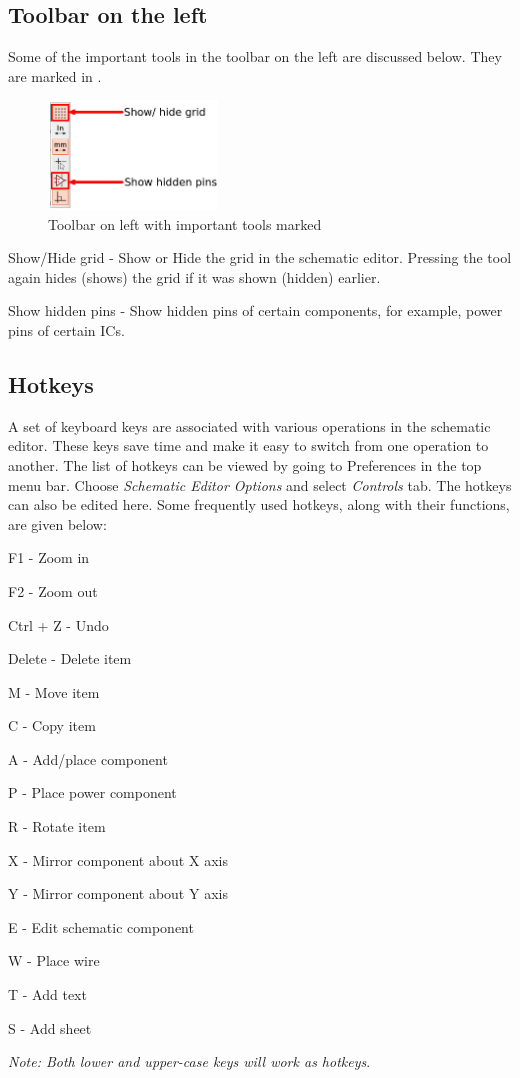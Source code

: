 \subsection{Toolbar on the left}
Some of the important tools in the toolbar on the left are discussed
below. They are marked in .
\begin{figure}[h]
\centering
\includegraphics[width=0.4\textwidth]{manual_images/lefttoolbar.png}
\caption{Toolbar on left with important tools marked}
\label{eeschem4}
\end{figure}

\begin{compactenum}
\item Show/Hide grid - Show or Hide the grid in the schematic editor. Pressing the tool again hides (shows) the grid if it was shown (hidden) earlier.
\item Show hidden pins - Show hidden pins of certain components, for  example, power pins of certain ICs. 
\end{compactenum}

\subsection{Hotkeys}
\label{short}
A set of keyboard keys are associated with various operations in the
schematic editor. These keys save time and make it easy to switch from
one operation to another. The list of hotkeys can be viewed by going
to Preferences in the top menu bar. Choose \textit{Schematic Editor Options} and select \textit{Controls} tab. The hotkeys can also be edited here. Some frequently used hotkeys, along with their functions, are given below:
\begin{compactitem}
\item F1 - Zoom in
\item F2 - Zoom out
\item Ctrl + Z - Undo
\item Delete - Delete item
\item M - Move item
\item C - Copy item
\item A - Add/place component 
\item P - Place power component
\item R - Rotate item
\item X - Mirror component about X axis
\item Y - Mirror component about Y axis
\item E - Edit schematic component
\item W - Place wire
\item T - Add text
\item S - Add sheet
\end{compactitem}
\textit{Note: Both lower and upper-case keys will work as hotkeys}. 

